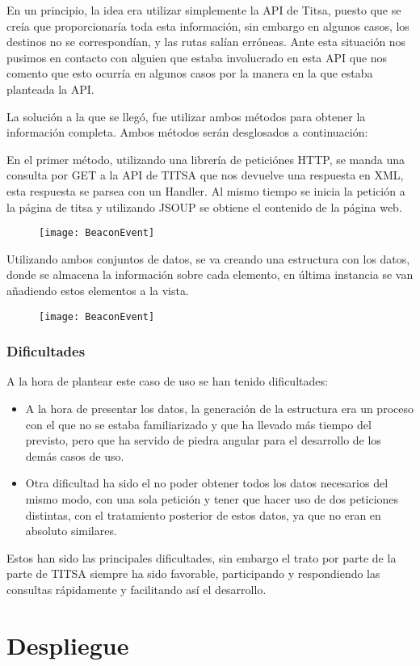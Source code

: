 En un principio, la idea era utilizar simplemente la API de Titsa, puesto que se creía que proporcionaría toda esta información, sin embargo en algunos casos, los destinos no se correspondían, y las rutas salían erróneas. Ante esta situación nos pusimos en contacto con alguien que estaba involucrado en esta API que nos comento que esto ocurría en algunos casos por la manera en la que estaba planteada la API.


La solución a la que se llegó, fue utilizar ambos métodos para obtener la información completa. Ambos métodos serán desglosados a continuación: 


En el primer método, utilizando una librería de peticiónes HTTP, se manda una consulta por GET a la API de TITSA que nos devuelve una respuesta en XML, esta respuesta se parsea con un Handler. Al mismo tiempo se inicia la petición a la página de titsa y utilizando JSOUP se obtiene el contenido de la página web.

\begin{figure}[H]
	\centering
	\texttt{[image: BeaconEvent]}
	\label{fig:eventBeacon}
\end{figure}


Utilizando ambos conjuntos de datos, se va creando una estructura con los datos, donde se almacena la información sobre cada elemento, en última instancia se van añadiendo estos elementos a la vista.

\begin{figure}[H]
	\centering
	\texttt{[image: BeaconEvent]}
	\label{fig:eventBeacon}
\end{figure}


\subsubsection{Dificultades}


A la hora de plantear este caso de uso se han tenido dificultades: 

\begin{itemize}
\item A la hora de presentar los datos, la generación de la estructura era un proceso con el que no se estaba familiarizado y que ha llevado más tiempo del previsto, pero que ha servido de piedra angular para el desarrollo de los demás casos de uso.
\item Otra dificultad ha sido el no poder obtener todos los datos necesarios del mismo modo, con una sola petición y tener que hacer uso de dos peticiones distintas, con el tratamiento posterior de estos datos, ya que no eran en absoluto similares.
\end{itemize}

Estos han sido las principales dificultades, sin embargo el trato por parte de la parte de TITSA siempre ha sido favorable, participando y respondiendo las consultas rápidamente y facilitando así el desarrollo.

\section{Despliegue}


